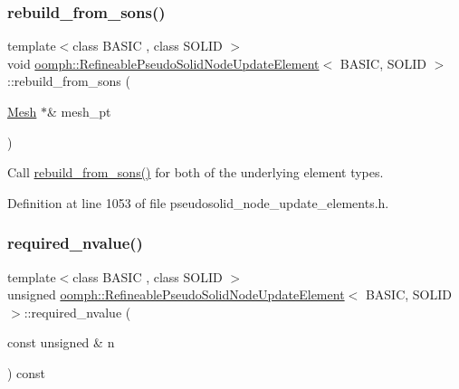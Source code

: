 \subsubsection{\texorpdfstring{rebuild\+\_\+from\+\_\+sons()}{rebuild\_from\_sons()}}
{\footnotesize\ttfamily template$<$class B\+A\+S\+IC , class S\+O\+L\+ID $>$ \\
void \hyperlink{classoomph_1_1RefineablePseudoSolidNodeUpdateElement}{oomph\+::\+Refineable\+Pseudo\+Solid\+Node\+Update\+Element}$<$ B\+A\+S\+IC, S\+O\+L\+ID $>$\+::rebuild\+\_\+from\+\_\+sons (\begin{DoxyParamCaption}\item[{\hyperlink{classoomph_1_1Mesh}{Mesh} $\ast$\&}]{mesh\+\_\+pt }\end{DoxyParamCaption})\hspace{0.3cm}{\ttfamily [inline]}}



Call \hyperlink{classoomph_1_1RefineablePseudoSolidNodeUpdateElement_ac653ab28abf52506f54b1306272390ce}{rebuild\+\_\+from\+\_\+sons()} for both of the underlying element types. 



Definition at line 1053 of file pseudosolid\+\_\+node\+\_\+update\+\_\+elements.\+h.

\mbox{\label{classoomph_1_1RefineablePseudoSolidNodeUpdateElement_af1d5e0fb32d61d553eba93b705ec0052}} 
\subsubsection{\texorpdfstring{required\+\_\+nvalue()}{required\_nvalue()}}
{\footnotesize\ttfamily template$<$class B\+A\+S\+IC , class S\+O\+L\+ID $>$ \\
unsigned \hyperlink{classoomph_1_1RefineablePseudoSolidNodeUpdateElement}{oomph\+::\+Refineable\+Pseudo\+Solid\+Node\+Update\+Element}$<$ B\+A\+S\+IC, S\+O\+L\+ID $>$\+::required\+\_\+nvalue (\begin{DoxyParamCaption}\item[{const unsigned \&}]{n }\end{DoxyParamCaption}) const\hspace{0.3cm}{\ttfamily [inline]}}



